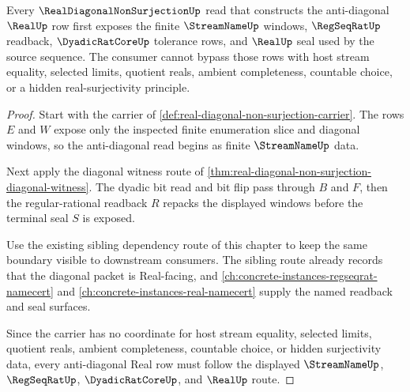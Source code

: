 \begin{theorem}
\label{thm:real-diagonal-non-surjection-regseqrat-dependency-route}
Every $\RealDiagonalNonSurjectionUp$ read that constructs the anti-diagonal $\RealUp$ row first exposes the finite $\StreamNameUp$ windows, $\RegSeqRatUp$ readback, $\DyadicRatCoreUp$ tolerance rows, and $\RealUp$ seal used by the source sequence. The consumer cannot bypass those rows with host stream equality, selected limits, quotient reals, ambient completeness, countable choice, or a hidden real-surjectivity principle.
\end{theorem}
\begin{proof}
Start with the carrier of \autoref{def:real-diagonal-non-surjection-carrier}. The rows $E$ and $W$ expose only the inspected finite enumeration slice and diagonal windows, so the anti-diagonal read begins as finite $\StreamNameUp$ data.

Next apply the diagonal witness route of \autoref{thm:real-diagonal-non-surjection-diagonal-witness}. The dyadic bit read and bit flip pass through $B$ and $F$, then the regular-rational readback $R$ repacks the displayed windows before the terminal seal $S$ is exposed.

Use the existing sibling dependency route of this chapter to keep the same boundary visible to downstream consumers. The sibling route already records that the diagonal packet is Real-facing, and \autoref{ch:concrete-instances-regseqrat-namecert} and \autoref{ch:concrete-instances-real-namecert} supply the named readback and seal surfaces.

Since the carrier has no coordinate for host stream equality, selected limits, quotient reals, ambient completeness, countable choice, or hidden surjectivity data, every anti-diagonal Real row must follow the displayed $\StreamNameUp$, $\RegSeqRatUp$, $\DyadicRatCoreUp$, and $\RealUp$ route.
\end{proof}
